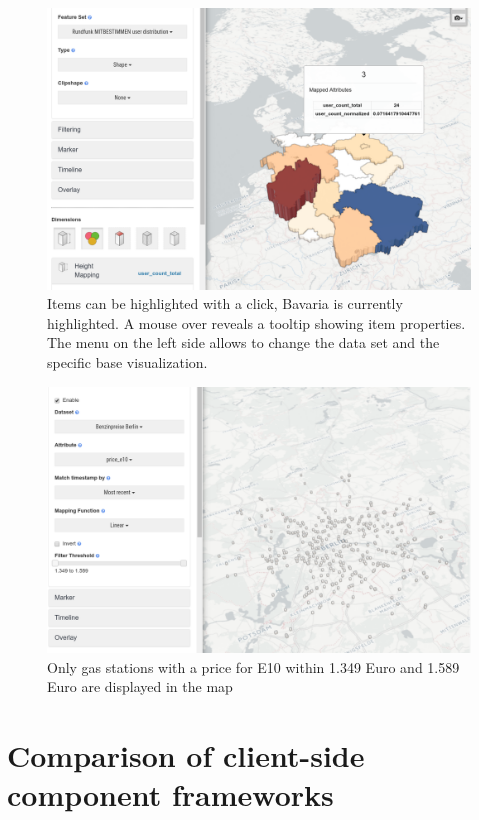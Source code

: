 \begin{figure}[h]
  \centering
  \includegraphics[width=\textwidth]{images/existing-interactions.png}
  \caption{%
    Items can be highlighted with a click, Bavaria is currently highlighted.
    A mouse over reveals a tooltip showing item properties.
    The menu on the left side allows to change the data set and the specific base visualization.
  }\label{fig:analysis:interaction:existing}
\end{figure}

\begin{figure}[h]
  \centering
  \includegraphics[width=\textwidth]{images/existing-interactions-filter.png}
  \caption{%
    Only gas stations with a price for E10 within 1.349 Euro and 1.589 Euro are displayed in the map
  }\label{fig:analysis:interaction:existing:filter}
\end{figure}

\section{Comparison of client-side component frameworks}\label{sec:analysis:frontend-framework-comparison}

